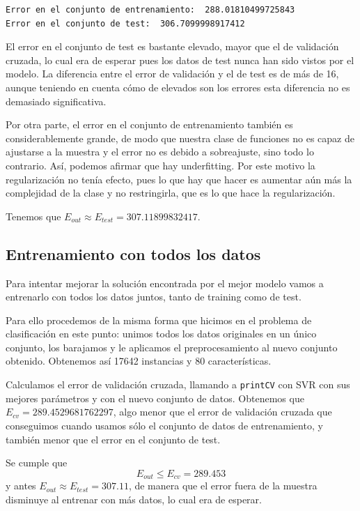 \documentclass[a4]{article}
\begin{document}
\begin{lstlisting}
Error en el conjunto de entrenamiento:  288.01810499725843
Error en el conjunto de test:  306.7099998917412
\end{lstlisting}

El error en el conjunto de test es bastante elevado, mayor que el de validación cruzada, lo cual era de esperar pues los datos de test nunca han sido vistos por el modelo. La diferencia entre el error de validación y el de test es de más de 16, aunque teniendo en cuenta cómo de elevados son los errores esta diferencia no es demasiado significativa. 

Por otra parte, el error en el conjunto de entrenamiento también es considerablemente grande, de modo que nuestra clase de funciones no es capaz de ajustarse a la muestra y el error no es debido a sobreajuste, sino todo lo contrario. Así, podemos afirmar que hay underfitting. Por este motivo la regularización no tenía efecto, pues lo que hay que hacer es aumentar aún más la complejidad de la clase y no restringirla, que es lo que hace la regularización. 

Tenemos que $E_{out}\approx E_{test}=307.11899832417$. 

\subsection{Entrenamiento con todos los datos }

Para intentar mejorar la solución encontrada por el mejor modelo vamos a entrenarlo con todos los datos juntos, tanto de training como de test. 

Para ello procedemos de la misma forma que hicimos en el problema de clasificación en este punto: unimos todos los datos originales en un único conjunto, los barajamos y le aplicamos el preprocesamiento al nuevo conjunto obtenido. Obtenemos así 17642 instancias y 80 características. 

Calculamos el error de validación cruzada, llamando a \lstinline|printCV| con SVR con sus mejores parámetros y con el nuevo conjunto de datos. Obtenemos que $E_{cv}=289.4529681762297$, algo menor que el error de validación cruzada que conseguimos cuando usamos sólo el conjunto de datos de entrenamiento, y también menor que el error en el conjunto de test. 

Se cumple que $$E_{out}\leq E_{cv}=289.453$$ y antes $E_{out}\approx E_{test}=307.11$, de manera que el error fuera de la muestra disminuye al entrenar con más datos, lo cual era de esperar. 
\end{document}

